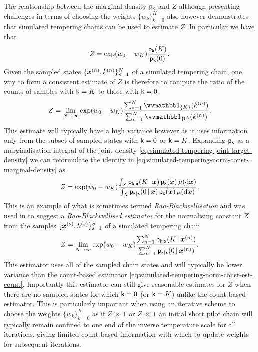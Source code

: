 The relationship between the marginal density $\mathsf{p}_{\mathsf{k}}$ and $Z$ although pres\-enting challenges in terms of choosing the weights $\lbrace w_k \rbrace_{k=0}^K$ also however demonstrates that simulated tempering chains can be used to estimate $Z$. In particular we have that
\begin{equation}\label{eq:simulated-tempering-norm-const-marginal-density}
  Z = \exp(w_0 -w_K) \frac{\mathsf{p}_{\mathsf{k}}(K)}{\mathsf{p}_{\mathsf{k}}(0)}.
\end{equation}
Given the sampled states $\lbrace \boldsymbol{x}^{(n)}, k^{(n)} \rbrace_{n=1}^N$ of a simulated tempering chain, one way to form a consistent estimate of $Z$ is therefore to compute the ratio of the counts of samples with $\mathsf{k}= K$ to those with $\mathsf{k} = 0$,
\begin{equation}\label{eq:simulated-tempering-norm-const-est-count}
  Z = \lim_{N \to \infty} \exp(w_0 - w_K) \frac{\sum_{n=1}^N \ind{\fset{K}}(k^{(n)})}{\sum_{n=1}^N \ind{\fset{0}}(k^{(n)})}.
\end{equation}
This estimate will typically have a high variance however as it uses information only from the subset of sampled states with $\mathsf{k}=0$ or $\mathsf{k}=K$. Expanding $\mathsf{p}_{\mathsf{k}}$ as a marginalisation integral of the joint density \eqref{eq:simulated-tempering-joint-target-density} we can reformulate the identity in \eqref{eq:simulated-tempering-norm-const-marginal-density} as 
\begin{equation}\label{eq:simulated-tempering-norm-const-rao-blackwellised}
  Z = \exp(w_0 -w_K) 
  \frac
  {\int_{\mathit{X}}\mathsf{p}_{\mathsf{k}|\boldsymbol{\mathsf{x}}}(K \operatorname{|} \boldsymbol{x})\,\mathsf{p}_{\boldsymbol{\mathsf{x}}}(\boldsymbol{x})\,\mu(\mathrm{d}\boldsymbol{x})}
  {\int_{\mathit{X}}\mathsf{p}_{\mathsf{k}|\boldsymbol{\mathsf{x}}}(0 \operatorname{|} \boldsymbol{x})\,\mathsf{p}_{\boldsymbol{\mathsf{x}}}(\boldsymbol{x})\,\mu(\mathrm{d}\boldsymbol{x})}.
\end{equation}
This is an example of what is sometimes termed \emph{Rao-Blackwellisation} \citep{casella1996rao} and was used in \citep{carlson2016partition} to suggest a \emph{Rao-Blackwellised estimator} for the normalising constant $Z$ from the samples $\lbrace \boldsymbol{x}^{(s)}, k^{(s)} \rbrace_{s=1}^S$ of a simulated tempering chain
\begin{equation}\label{eq:simulated-tempering-norm-const-est-rb}
  Z = \lim_{N \to \infty} \exp(w_0 - w_K) \frac{\sum_{n=1}^N \mathsf{p}_{\mathsf{k}|\boldsymbol{\mathsf{x}}}(K \operatorname{|} \boldsymbol{x}^{(n)})}{\sum_{n=1}^N \mathsf{p}_{\mathsf{k}|\boldsymbol{\mathsf{x}}}(0 \operatorname{|} \boldsymbol{x}^{(n)})}.
\end{equation}
This estimator uses all of the sampled chain states and will typically be lower variance than the count-based estimator \eqref{eq:simulated-tempering-norm-const-est-count}. Importantly this estimator can still give reasonable estimates for $Z$ when there are no sampled states for which $\mathsf{k}=0$ (or $\mathsf{k}=K$) unlike the count-based estimator. This is particularly important when using an iterative scheme to choose the weights $\lbrace w_k \rbrace_{k=0}^K$ as if $Z \gg 1$ or $Z \ll 1$ an initial short pilot chain will typically remain confined to one end of the inverse temperature scale for all iterations, giving limited count-based information with which to update weights for subsequent iterations.

